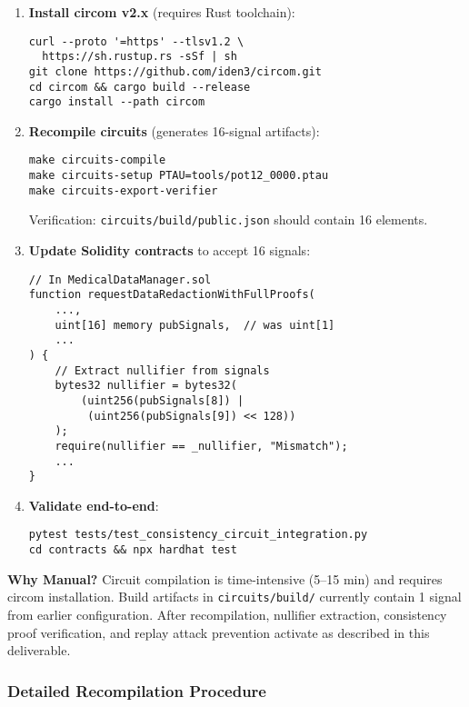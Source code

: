 \begin{enumerate}
    \item \textbf{Install circom v2.x} (requires Rust toolchain):
    \begin{verbatim}
curl --proto '=https' --tlsv1.2 \
  https://sh.rustup.rs -sSf | sh
git clone https://github.com/iden3/circom.git
cd circom && cargo build --release
cargo install --path circom
    \end{verbatim}
    
    \item \textbf{Recompile circuits} (generates 16-signal artifacts):
    \begin{verbatim}
make circuits-compile
make circuits-setup PTAU=tools/pot12_0000.ptau
make circuits-export-verifier
    \end{verbatim}
    Verification: \texttt{circuits/build/public.json} should contain 16 elements.
    
    \item \textbf{Update Solidity contracts} to accept 16 signals:
    \begin{verbatim}
// In MedicalDataManager.sol
function requestDataRedactionWithFullProofs(
    ...,
    uint[16] memory pubSignals,  // was uint[1]
    ...
) {
    // Extract nullifier from signals
    bytes32 nullifier = bytes32(
        (uint256(pubSignals[8]) | 
         (uint256(pubSignals[9]) << 128))
    );
    require(nullifier == _nullifier, "Mismatch");
    ...
}
    \end{verbatim}
    
    \item \textbf{Validate end-to-end}:
    \begin{verbatim}
pytest tests/test_consistency_circuit_integration.py
cd contracts && npx hardhat test
    \end{verbatim}
\end{enumerate}

\textbf{Why Manual?} Circuit compilation is time-intensive (5--15 min) and requires circom installation. Build artifacts in \texttt{circuits/build/} currently contain 1 signal from earlier configuration. After recompilation, nullifier extraction, consistency proof verification, and replay attack prevention activate as described in this deliverable.

\subsubsection{Detailed Recompilation Procedure}

